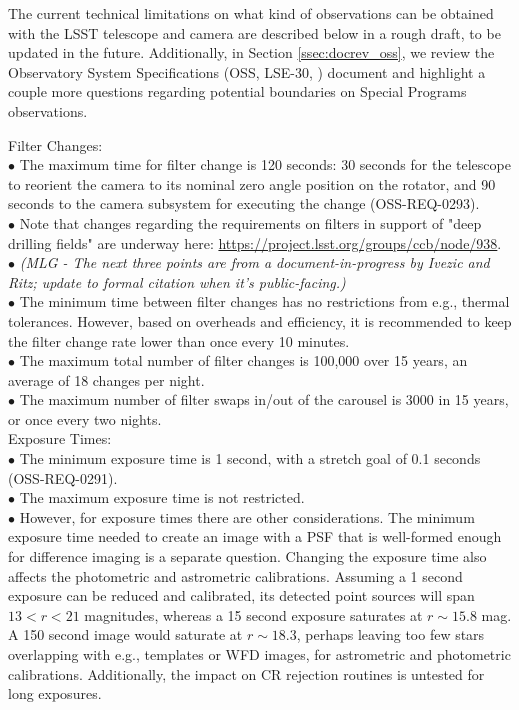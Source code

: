 \documentclass[DM,lsstdraft,toc]{lsstdoc}
\begin{document}
The current technical limitations on what kind of observations can be obtained with the LSST telescope and camera are described below in a rough draft, to be updated in the future. Additionally, in Section \ref{ssec:docrev_oss}, we review the Observatory System Specifications (OSS, LSE-30, \cite{LSE-30}) document and highlight a couple more questions regarding potential boundaries on Special Programs observations.

Filter Changes: \\
$\bullet$ The maximum time for filter change is 120 seconds: 30 seconds for the telescope to reorient the camera to its nominal zero angle position on the rotator, and 90 seconds to the camera subsystem for executing the change (OSS-REQ-0293). \\
$\bullet$ Note that changes regarding the requirements on filters in support of "deep drilling fields" are underway here: \url{https://project.lsst.org/groups/ccb/node/938}.
$\bullet$ \textit{(MLG - The next three points are from a document-in-progress by Ivezic and Ritz; update to formal citation when it's public-facing.)} \\
$\bullet$ The minimum time between filter changes has no restrictions from e.g., thermal tolerances. However, based on overheads and efficiency, it is recommended to keep the filter change rate lower than once every 10 minutes. \\
$\bullet$ The maximum total number of filter changes is 100,000 over 15 years, an average of 18 changes per night. \\
$\bullet$ The maximum number of filter swaps in/out of the carousel is 3000 in 15 years, or once every two nights. \\

Exposure Times: \\
$\bullet$ The minimum exposure time is 1 second, with a stretch goal of 0.1 seconds (OSS-REQ-0291). \\
$\bullet$ The maximum exposure time is not restricted. \\
$\bullet$ However, for exposure times there are other considerations. The minimum exposure time needed to create an image with a PSF that is well-formed enough for difference imaging is a separate question. Changing the exposure time also affects the photometric and astrometric calibrations. Assuming a 1 second exposure can be reduced and calibrated, its detected point sources will span $13 < r < 21$ magnitudes, whereas a 15 second exposure saturates at $r\sim15.8$ mag. A 150 second image would saturate at $r\sim18.3$, perhaps leaving too few stars overlapping with e.g., templates or WFD images, for astrometric and photometric calibrations. Additionally, the impact on CR rejection routines is untested for long exposures. 
\end{document}
